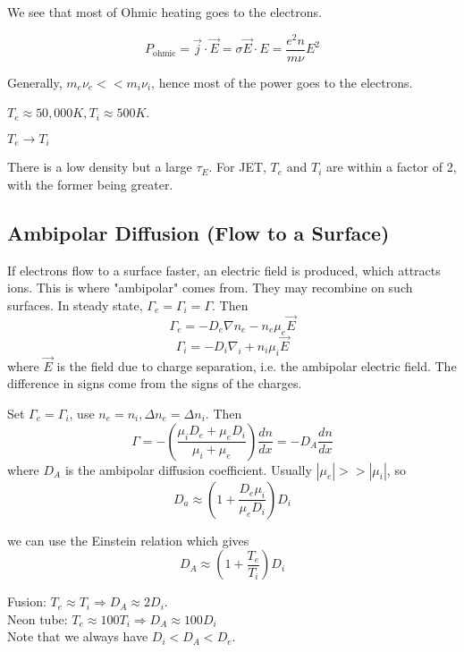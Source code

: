 \documentclass[12pt]{article}
\begin{document}
We see that most of Ohmic heating goes to the electrons.

$$P_{\text{ohmic}} = \vec j \cdot \vec E = \sigma \vec E \cdot E = \frac{e^2n}{m\nu} E^2$$

Generally, $m_e\nu_e << m_i\nu_i$, hence most of the power goes to the electrons.

\begin{ex}
    $T_e \approx 50,000\unit{K}, T_i \approx 500 \unit{K}$.
\end{ex}

\begin{ex}
    $T_e \rightarrow T_i$
\end{ex}

\begin{ex}[Fusion]
    There is a low density but a large $\tau_E$. For JET, $T_e$ and $T_i$ are within a factor of 2, with the former being greater.
\end{ex}

\subsection{Ambipolar Diffusion (Flow to a Surface)}

If electrons flow to a surface faster, an electric field is produced, which attracts ions. This is where "ambipolar" comes from. They may recombine on such surfaces. In steady state, $\Gamma_e = \Gamma_i = \Gamma$. Then
$$\Gamma_e = -D_e\nabla n_e - n_e\mu_e\vec E$$
$$\Gamma_i = -D_i \nabla_i + n_i\mu_i\vec E$$
where $\vec E$ is the field due to charge separation, i.e. the ambipolar electric field. The difference in signs come from the signs of the charges.

Set $\Gamma_e = \Gamma_i$, use $n_e = n_i, \Delta n_e = \Delta n_i$. Then
$$\Gamma = -\left(\frac{\mu_iD_e + \mu_eD_i}{\mu_i + \mu_e}\right)\frac{dn}{dx} = -D_A\frac{dn}{dx}$$
where $D_A$ is the ambipolar diffusion coefficient. Usually $|\mu_e| >> |\mu_i|$, so
$$D_a \approx \left(1 + \frac{D_e\mu_i}{\mu_eD_i}\right)D_i$$

we can use the Einstein relation which gives
$$D_A \approx \left(1 + \frac{T_e}{T_i}\right)D_i$$

\begin{ex}
    Fusion: $T_e \approx T_i \Rightarrow D_A \approx 2D_i$. \\
    Neon tube: $T_e \approx 100 T_i \Rightarrow D_A \approx 100 D_i$ \\
    Note that we always have $D_i < D_A < D_e$.
\end{ex}
\end{document}
